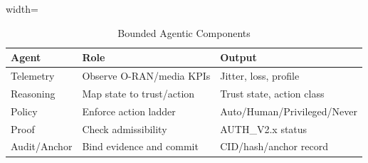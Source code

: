 \begin{table}[!t]
\centering
\caption{Bounded Agentic Components}
\label{tab:agents}
\begin{adjustbox}{width=\columnwidth}
\begin{tabular}{lll}
\toprule
Agent & Role & Output \\
\midrule
Telemetry & Observe O-RAN/media KPIs & Jitter, loss, profile \\
Reasoning & Map state to trust/action & Trust state, action class \\
Policy & Enforce action ladder & Auto/Human/Privileged/Never \\
Proof & Check admissibility & AUTH\_V2.x status \\
Audit/Anchor & Bind evidence and commit & CID/hash/anchor record \\
\bottomrule
\end{tabular}
\end{adjustbox}
\end{table}

